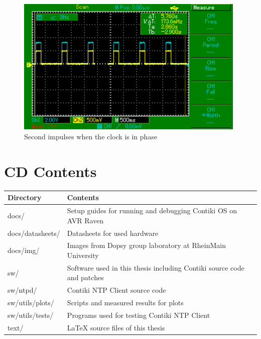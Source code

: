 \begin{figure}[H]
  \centering
  \includegraphics[width=11cm,keepaspectratio]{fig/osc-in-phase.png}
  \caption{Second impulses when the clock is in phase}
  \label{fig:app-osc-in-phase}
  \bigskip
\end{figure}


\chapter{CD Contents}\label{app:cd-contents} %
\begin{tabular}{|l|l|}
	\hline
	Directory & Contents \\ \hline
	docs/ & Setup guides for running and debugging Contiki OS on AVR Raven\\
	docs/datasheets/ & Datasheets for used hardware\\
	docs/img/ & Images from Dopsy group laboratory at RheinMain University\\
	sw/ & Software used in this thesis including Contiki source code and patches\\
	sw/ntpd/ & Contiki NTP Client source code\\
	sw/utils/plots/ & Scripts and measured results for plots\\
	sw/utils/tests/ & Programs used for testing Contiki NTP Client\\
	text/ & LaTeX source files of this thesis\\
	\hline
\end{tabular}
